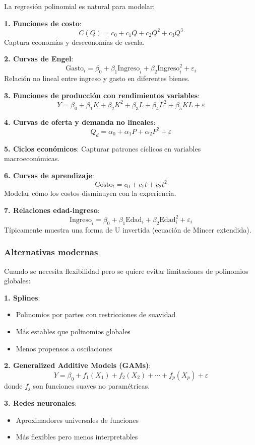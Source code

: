 \documentclass[
  doc,
  floatsintext,
  longtable,
  a4paper,
  nolmodern,
  notxfonts,
  notimes,
  12pt,
  colorlinks=true,linkcolor=blue,citecolor=blue,urlcolor=blue]{apa7}
\providecommand{\tightlist}{%
  \setlength{\itemsep}{0pt}\setlength{\parskip}{0pt}}
\begin{document}
La regresión polinomial es natural para modelar:

\textbf{1. Funciones de costo}: \[
C(Q) = c_0 + c_1 Q + c_2 Q^2 + c_3 Q^3
\] Captura economías y deseconomías de escala.

\textbf{2. Curvas de Engel}: \[
\text{Gasto}_i = \beta_0 + \beta_1 \text{Ingreso}_i + \beta_2 \text{Ingreso}_i^2 + \varepsilon_i
\] Relación no lineal entre ingreso y gasto en diferentes bienes.

\textbf{3. Funciones de producción con rendimientos variables}: \[
Y = \beta_0 + \beta_1 K + \beta_2 K^2 + \beta_3 L + \beta_4 L^2 + \beta_5 KL + \varepsilon
\]

\textbf{4. Curvas de oferta y demanda no lineales}: \[
Q_d = \alpha_0 + \alpha_1 P + \alpha_2 P^2 + \varepsilon
\]

\textbf{5. Ciclos económicos}: Capturar patrones cíclicos en variables
macroeconómicas.

\textbf{6. Curvas de aprendizaje}: \[
\text{Costo}_t = c_0 + c_1 t + c_2 t^2
\] Modelar cómo los costos disminuyen con la experiencia.

\textbf{7. Relaciones edad-ingreso}: \[
\text{Ingreso}_i = \beta_0 + \beta_1 \text{Edad}_i + \beta_2 \text{Edad}_i^2 + \varepsilon_i
\] Típicamente muestra una forma de U invertida (ecuación de Mincer
extendida).

\subsubsection{Alternativas modernas}\label{alternativas-modernas}

Cuando se necesita flexibilidad pero se quiere evitar limitaciones de
polinomios globales:

\textbf{1. Splines}:

\begin{itemize}
\tightlist
\item
  Polinomios por partes con restricciones de suavidad
\item
  Más estables que polinomios globales
\item
  Menos propensos a oscilaciones
\end{itemize}

\textbf{2. Generalized Additive Models (GAMs)}: \[
Y = \beta_0 + f_1(X_1) + f_2(X_2) + \cdots + f_p(X_p) + \varepsilon
\] donde \(f_j\) son funciones suaves no paramétricas.

\textbf{3. Redes neuronales}:

\begin{itemize}
\tightlist
\item
  Aproximadores universales de funciones
\item
  Más flexibles pero menos interpretables
\end{itemize}
\end{document}
